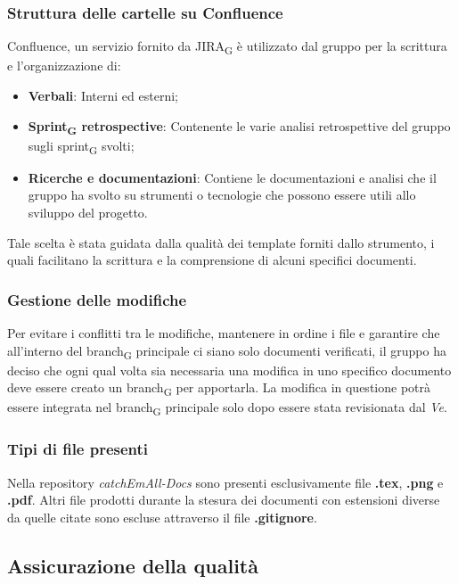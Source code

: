 \subsubsection{Struttura delle cartelle su Confluence}
Confluence, un servizio fornito da JIRA\textsubscript{G} è utilizzato dal gruppo per la scrittura e l'organizzazione di:
\begin{itemize}
	\item \textbf{Verbali}: Interni ed esterni;
	\item \textbf{Sprint\textsubscript{G} retrospective}: Contenente le varie analisi retrospettive del gruppo sugli sprint\textsubscript{G} svolti;
	\item \textbf{Ricerche e documentazioni}: Contiene le documentazioni e analisi che il gruppo ha svolto su strumenti o tecnologie che possono essere utili allo sviluppo del progetto.
\end{itemize}
Tale scelta è stata guidata dalla qualità dei template forniti dallo strumento, i quali facilitano la scrittura e la comprensione di alcuni specifici documenti.

\subsubsection{Gestione delle modifiche}
Per evitare i conflitti tra le modifiche, mantenere in ordine i file e garantire che all'interno del branch\textsubscript{G} principale ci siano solo documenti verificati, il gruppo ha deciso che ogni qual volta sia necessaria una modifica in uno specifico documento deve essere creato un branch\textsubscript{G} per apportarla. La modifica in questione potrà essere integrata nel branch\textsubscript{G} principale solo dopo essere stata revisionata dal \textit{Ve}.

\subsubsection{Tipi di file presenti}
Nella repository \textit{catchEmAll-Docs} sono presenti esclusivamente file \textbf{.tex}, \textbf{.png} e \textbf{.pdf}. Altri file prodotti durante la stesura dei documenti con estensioni diverse da quelle citate sono escluse attraverso il file \textbf{.gitignore}.



\subsection{Assicurazione della qualità}
